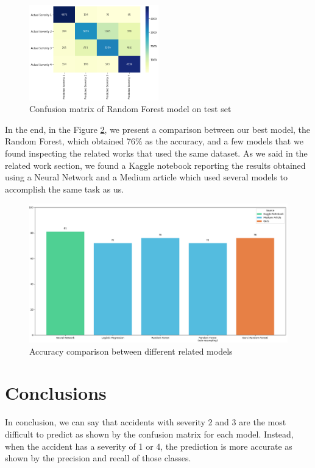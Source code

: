 \documentclass{article}
\begin{document}
\begin{figure}[h!]
\centering
\includegraphics[width=0.5\textwidth]{best-model-testset}
\caption{Confusion matrix of Random Forest model on test set}
\label{img:conf-matrix}
\end{figure}

In the end, in the Figure \ref{img:acc-comp}, we present a comparison between our best model, the Random Forest, which obtained 76\% as the accuracy, and a few models that we found inspecting the related works that used the same dataset.
As we said in the related work section, we found a Kaggle notebook reporting the results obtained using a Neural Network and a Medium article which used several models to accomplish the same task as us.

\begin{figure}[h!]
\centering
\includegraphics[width=\textwidth]{accuracy-comparison}
\caption{Accuracy comparison between different related models}
\label{img:acc-comp}
\end{figure}

\section{Conclusions}

In conclusion, we can say that accidents with severity 2 and 3 are the most difficult to predict as shown by the confusion matrix for each model. Instead, when the accident has a severity of 1 or 4, the prediction is more accurate as shown by the precision and recall of those classes.
\end{document}
